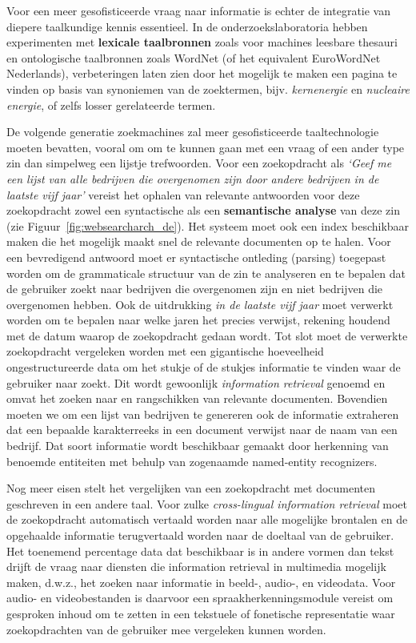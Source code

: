 \documentclass[]{../../metanetpaper}
\begin{document}
\begin{multicols}{2}
    Voor een meer gesofisticeerde vraag naar informatie is echter de integratie van diepere taalkundige kennis essentieel. In de onderzoekslaboratoria hebben experimenten met \textbf{lexicale taalbronnen} zoals voor machines leesbare thesauri en ontologische taalbronnen zoals WordNet (of het equivalent EuroWordNet Nederlands), verbeteringen laten zien door het mogelijk te maken een pagina te vinden op basis van synoniemen van de zoektermen, bijv. \emph{kernenergie} en \emph{nucleaire energie}, of zelfs losser gerelateerde termen.


    De volgende generatie zoekmachines zal meer gesofisticeerde taaltechnologie moeten bevatten, vooral om om te kunnen gaan met een vraag of een ander type zin dan simpelweg een lijstje trefwoorden. Voor een zoekopdracht als \emph{`Geef me een lijst van alle bedrijven die overgenomen zijn door andere bedrijven in de laatste vijf jaar'}  vereist het ophalen van relevante antwoorden voor deze zoekopdracht zowel een syntactische als een \textbf{semantische  analyse} van deze zin  (zie Figuur~\ref{fig:websearcharch_de}). Het systeem  moet ook  een index beschikbaar maken die het mogelijk maakt snel de relevante documenten op te halen.  Voor een bevredigend antwoord moet er syntactische ontleding (parsing) toegepast worden om de grammaticale structuur van de zin te analyseren en te bepalen dat de gebruiker zoekt naar bedrijven die overgenomen zijn en niet bedrijven die overgenomen hebben. Ook de uitdrukking \emph{in de laatste vijf jaar} moet verwerkt worden om te bepalen naar welke jaren het precies verwijst, rekening houdend met de datum waarop de zoekopdracht gedaan wordt.     Tot slot moet de verwerkte zoekopdracht vergeleken worden met een gigantische hoeveelheid ongestructureerde data om het stukje of de stukjes informatie te vinden waar de gebruiker naar zoekt. Dit wordt gewoonlijk \emph{information retrieval} genoemd en omvat het zoeken naar en rangschikken van relevante documenten. Bovendien moeten we om een lijst van bedrijven te genereren ook de informatie extraheren dat een bepaalde karakterreeks in een document verwijst naar de naam van een bedrijf. Dat soort informatie wordt beschikbaar gemaakt door herkenning van benoemde entiteiten met behulp van zogenaamde named-entity recognizers.

    Nog meer eisen stelt het vergelijken van een zoekopdracht  met documenten geschreven in een andere taal. Voor zulke \emph{cross-lingual information retrieval} moet  de zoekopdracht automatisch vertaald worden naar alle mogelijke brontalen en de opgehaalde informatie terugvertaald worden naar de doeltaal van de gebruiker. 
    Het toenemend percentage data dat beschikbaar is in andere vormen dan tekst drijft de vraag naar diensten die information retrieval in multimedia mogelijk maken, d.w.z., het zoeken naar informatie in beeld-, audio-, en videodata. Voor audio- en videobestanden is daarvoor een spraakherkenningsmodule vereist om gesproken inhoud om te zetten in een tekstuele of fonetische representatie waar zoekopdrachten van de gebruiker mee vergeleken kunnen worden.


\end{multicols}
\end{document}
